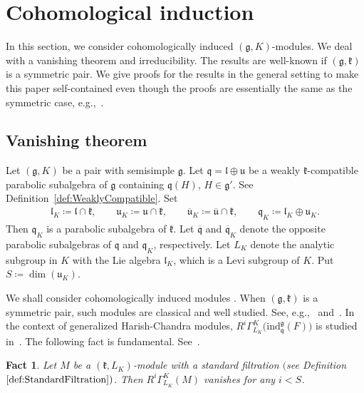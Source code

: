 \documentclass[10pt,a4paper]{amsart}
\numberwithin{equation}{section}
\newtheorem{Fact}[Theorem]{Fact}
\theoremstyle{definition}
\newcommand{\lieC}[1]{\mathfrak{#1}}
\newcommand{\lie}[1]{\mathfrak{#1}}
\newcommand{\ind}[2]{\mathrm{ind}^{\lieC{#1}}_{\lieC{#2}}}
\newcommand{\zuck}[2]{\Gamma^{#1}_{#2}}
\newcommand{\Dzuck}[3]{R^{#3}\zuck{#1}{#2}}
\begin{document}
\section{Cohomological induction}

In this section, we consider cohomologically induced $(\lie{g}, K)$-modules.
We deal with a vanishing theorem and irreducibility.
The results are well-known if $(\lie{g}, \lie{k})$ is a symmetric pair.
We give proofs for the results in the general setting to make this paper self-contained
even though the proofs are essentially the same as the symmetric case, e.g.,~\cite[Section~6]{Wa88_real_reductive_I}.

\subsection{Vanishing theorem}

Let $(\lie{g}, K)$ be a pair with semisimple $\lie{g}$.
Let $\lie{q} = \lie{l}\oplus \lie{u}$ be a weakly $\lie{k}$-compatible parabolic subalgebra of $\lie{g}$
containing $\lie{q}(H)$, $H \in \lie{g'}$.
See Definition~\ref{def:WeaklyCompatible}.
Set
\begin{align*}
	\lie{l}_K\coloneq \lie{l}\cap \lie{k}, \qquad \lie{u}_K\coloneq \lie{u}\cap \lie{k}, \qquad \lie{\overline{u}}_K\coloneq \lie{\overline{u}}\cap \lie{k}, \qquad \lie{q}_K\coloneq \lie{l}_K\oplus \lie{u}_K.
\end{align*}
Then $\lie{q}_K$ is a parabolic subalgebra of $\lie{k}$.
Let $\lie{\overline{q}}$ and $\lie{\overline{q}}_K$ denote the opposite parabolic subalgebras of $\lie{q}$ and $\lie{q}_K$, respectively.
Let $L_K$ denote the analytic subgroup in $K$ with the Lie algebra $\lie{l}_K$, which is a Levi subgroup of $K$.
Put $S\coloneq \dim(\lie{u}_K)$.

We shall consider cohomologically induced modules \smash{$\Dzuck{K}{L_K}{i}\bigl(\ind{g}{q}(F)\bigr)$}.
When $(\lie{g}, \lie{k})$ is a symmetric pair, such modules are classical and well studied.
See, e.g.,~\cite{KnVo95_cohomological_induction} and~\cite[Section~6]{Wa88_real_reductive_I}.
In the context of generalized Harish-Chandra modules, $\Dzuck{K}{L_K}{i}\bigl(\ind{g}{q}(F)\bigr)$ is studied in~\cite{PeZu04_generalized_harish_chandra,PeZu12_generalized_harish_chandra}.
The following fact is fundamental.
See~\cite[Lemma~6.4.2]{Wa88_real_reductive_I}.

\begin{Fact}\label{fact:StandardFiltrationVanishing}
	Let $M$ be a $(\lie{k}, L_K)$-module with a standard filtration $($see Definition $\ref{def:StandardFiltration})$.
	Then $\Dzuck{K}{L_K}{i}(M)$ vanishes for any $i < S$.
\end{Fact}
\end{document}
